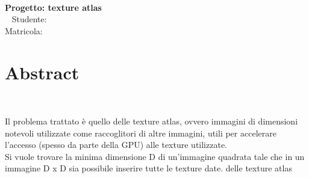 
\begin{center}
	\hspace{0pt}
	\vfill
	\Huge{
		\textbf{\thetitle} \\
		\LARGE{\textbf{Progetto: texture atlas}} \\
		\ \newline \newline \newline
		\Large{	Studente: \textbf{\theauthor} } \\
		\normalsize{{Matricola: \textbf{\matNum}} }
	}
	\vfill
	\hspace{0pt}
\end{center}
\newpage

\tableofcontents    
\newpage


\iffalse



\fi



	\section{Abstract} 
	\ \newline

Il problema trattato è quello delle texture atlas, ovvero immagini di dimensioni notevoli utilizzate come raccoglitori di altre immagini, utili per accelerare l'accesso (spesso da parte della GPU) alle texture utilizzate. \\

Si vuole trovare la minima dimensione D di un'immagine quadrata tale che in un immagine D x D sia possibile inserire tutte le texture date.
	delle texture atlas


\newpage